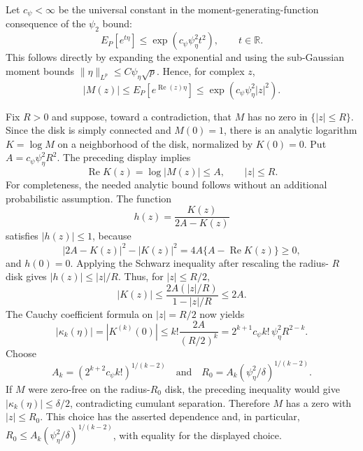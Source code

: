 Let \(c_{\psi}<\infty\) be the universal constant in the moment-generating-function consequence of the \(\psi_2\) bound:
\[
 E_P[e^{t\eta}]\le \exp(c_{\psi}\psi_{\eta}^{2}t^{2}),
 \qquad t\in\mathbb R.
\]
This follows directly by expanding the exponential and using the sub-Gaussian moment bounds \(\|\eta\|_{L^p}\le C\psi_{\eta}\sqrt p\).  Hence, for complex \(z\),
\[
 |M(z)|\le E_P[e^{\operatorname{Re}(z)\eta}]
 \le \exp(c_{\psi}\psi_{\eta}^{2}|z|^{2}).
\]

Fix \(R>0\) and suppose, toward a contradiction, that \(M\) has no zero in \(\{|z|\le R\}\).  Since the disk is simply connected and \(M(0)=1\), there is an analytic logarithm \(K=\log M\) on a neighborhood of the disk, normalized by \(K(0)=0\).  Put \(A=c_{\psi}\psi_{\eta}^{2}R^{2}\).  The preceding display implies
\[
 \operatorname{Re}K(z)=\log|M(z)|\le A,
 \qquad |z|\le R.
\]
For completeness, the needed analytic bound follows without an additional probabilistic assumption.  The function
\[
 h(z)=\frac{K(z)}{2A-K(z)}
\]
satisfies \(|h(z)|\le1\), because
\[
 |2A-K(z)|^{2}-|K(z)|^{2}
 =4A\{A-\operatorname{Re}K(z)\}\ge0,
\]
and \(h(0)=0\).  Applying the Schwarz inequality after rescaling the radius-
\(R\) disk gives \(|h(z)|\le |z|/R\).  Thus, for \(|z|\le R/2\),
\[
 |K(z)|\le \frac{2A(|z|/R)}{1-|z|/R}\le2A.
\]
The Cauchy coefficient formula on \(|z|=R/2\) now yields
\[
 |\kappa_k(\eta)|=|K^{(k)}(0)|
 \le k!\frac{2A}{(R/2)^k}
 =2^{k+1}c_{\psi}k!\,\psi_{\eta}^{2}R^{2-k}.
\]
Choose
\[
 A_k=(2^{k+2}c_{\psi}k!)^{1/(k-2)}
 \quad\text{and}\quad
 R_0=A_k(\psi_{\eta}^{2}/\delta)^{1/(k-2)}.
\]
If \(M\) were zero-free on the radius-\(R_0\) disk, the preceding inequality would give \(|\kappa_k(\eta)|\le\delta/2\), contradicting cumulant separation.  Therefore \(M\) has a zero with \(|z|\le R_0\).  This choice has the asserted dependence and, in particular, \(R_0\le A_k(\psi_{\eta}^{2}/\delta)^{1/(k-2)}\), with equality for the displayed choice.